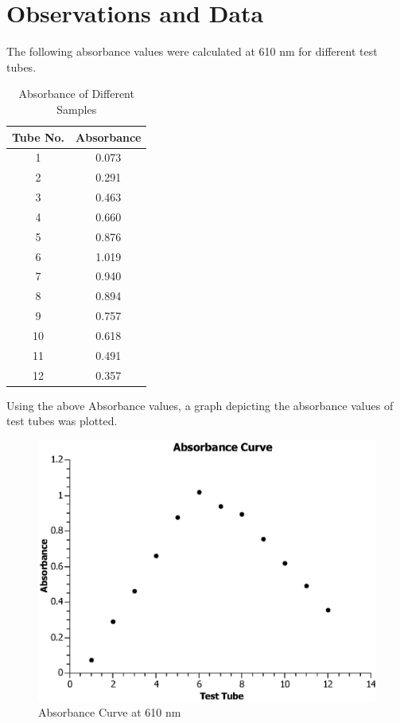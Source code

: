\documentclass[12pt]{article}
\theoremstyle{definition}
\theoremstyle{definition}
\theoremstyle{remark}
\begin{document}
\pagebreak


\section*{Observations and Data}

The following absorbance values were calculated at 610 nm for different test tubes.

\begin{table}[H]
   \centering
    \begin{tabular}{|c|c|}
    \hline
    \textbf{Tube No.} & \textbf{Absorbance}\\
    \hline
      1   & 0.073 \\
      \hline
       2  & 0.291\\
       \hline
       3  & 0.463\\
       \hline
       4  & 0.660\\
       \hline
       5  & 0.876\\
       \hline
       6  & 1.019\\
       \hline
       7  & 0.940\\
       \hline
       8  & 0.894\\
       \hline
       9  & 0.757\\
       \hline
       10 & 0.618\\
       \hline
       11  & 0.491\\
       \hline
       12  & 0.357\\
      \hline
    \end{tabular}
    \caption{Absorbance of Different Samples}
    \label{tab:my_label}
\end{table}

Using the above Absorbance values, a graph depicting the absorbance values of test tubes was plotted.

\begin{figure}[H]
    \centering
    \includegraphics{Graph4.eps}
    \caption{Absorbance Curve at 610 nm}
    \label{fig:enter-label}
\end{figure}
\end{document}
